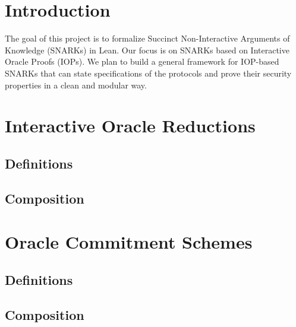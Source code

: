 %

\chapter{Introduction}

The goal of this project is to formalize Succinct Non-Interactive Arguments of Knowledge (SNARKs) in Lean. Our focus is on SNARKs based on Interactive Oracle Proofs (IOPs). We plan to build a general framework for IOP-based SNARKs that can state specifications of the protocols and prove their security properties in a clean and modular way.

\chapter{Interactive Oracle Reductions}

\section{Definitions}

\section{Composition}

\chapter{Oracle Commitment Schemes}

\section{Definitions}

\section{Composition}



